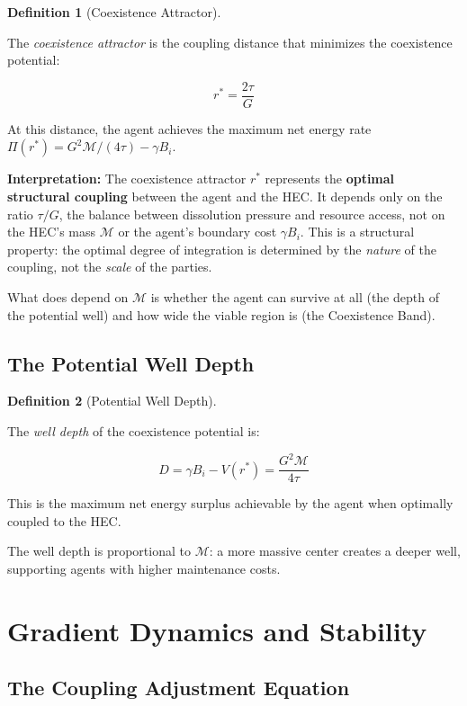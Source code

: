 \documentclass[11pt]{article}
\theoremstyle{plain}
\theoremstyle{definition}
\newtheorem{definition}{Definition}
\theoremstyle{remark}
\let\origsection\section
\renewcommand{\section}{\needspace{12\baselineskip}\origsection}
\let\origsubsection\subsection
\renewcommand{\subsection}{\needspace{7\baselineskip}\origsubsection}
\begin{document}
\begin{definition}[Coexistence Attractor]
\label{def-coexistence-attractor}

The \emph{coexistence attractor} is the coupling distance that minimizes the coexistence potential:

$$r^* = \frac{2\tau}{G}$$

At this distance, the agent achieves the maximum net energy rate $\Pi(r^*) = G^2\mathcal{M}/(4\tau) - \gamma B_i$.
\end{definition}

\textbf{Interpretation:} The coexistence attractor \(r^*\) represents
the \textbf{optimal structural coupling} between the agent and the HEC.
It depends only on the ratio \(\tau/G\), the balance between dissolution
pressure and resource access, not on the HEC's mass \(\mathcal{M}\) or
the agent's boundary cost \(\gamma B_i\). This is a structural property:
the optimal degree of integration is determined by the \emph{nature} of
the coupling, not the \emph{scale} of the parties.

What does depend on \(\mathcal{M}\) is whether the agent can survive at
all (the depth of the potential well) and how wide the viable region is
(the Coexistence Band).

\subsection{The Potential Well Depth}\label{the-potential-well-depth}

\begin{definition}[Potential Well Depth]
\label{def-potential-well-depth}

The \emph{well depth} of the coexistence potential is:

$$D = \gamma B_i - V(r^*) = \frac{G^2 \mathcal{M}}{4\tau}$$

This is the maximum net energy surplus achievable by the agent when optimally coupled to the HEC.
\end{definition}

The well depth is proportional to \(\mathcal{M}\): a more massive center
creates a deeper well, supporting agents with higher maintenance costs.

\section{Gradient Dynamics and
Stability}\label{gradient-dynamics-and-stability}

\subsection{The Coupling Adjustment
Equation}\label{the-coupling-adjustment-equation}
\end{document}
